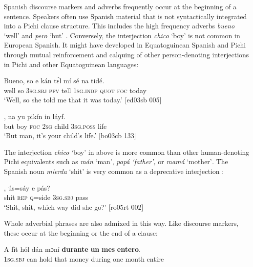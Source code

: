 Spanish discourse markers and adverbs frequently occur at the beginning of a sentence. Speakers often use Spanish material that is not syntactically integrated into a Pichi clause structure. This includes the high frequency adverbs \textit{bueno} ‘well’  and \textit{pero} ‘but’ . Conversely, the interjection \textit{chico} ‘boy’  is not common in European Spanish. It might have developed in Equatoguinean Spanish and Pichi through mutual reinforcement and calquing of other person-denoting interjections in Pichi and other Equatoguinean languages:


\ea%
    \label{ex:key:1735}
    \gll Bueno,  so  e    kán  tɛ́l  mí    sé    na  tidé.\\
well    so  \textsc{3sg.sbj}  \textsc{pfv}  tell  \textsc{1sg.indp}  \textsc{quot}    \textsc{foc}  today\\

\glt ‘Well, so she told me that it was today.’ [ed03sb 005]
\z


\ea%
    \label{ex:key:1736}
    \gll {}  ,  na  yu  pikín  in    láyf.\\
but    boy    \textsc{foc}  \textsc{2sg}  child  \textsc{3sg.poss}  life\\
\glt ‘But man, it’s your child’s life.’ [bo03cb 133]
\z

The interjection \textit{chico} ‘boy’ in  above is more common than other human-denoting Pichi equivalents such as \textit{mán} ‘man’,\textit{ papá} \textit{\textup{‘father’,} }or \textit{mamá} ‘mother’\textit{.} The Spanish noun \textit{mierda} ‘shit’\textit{} is very common as a deprecative interjection :


\ea%
    \label{ex:key:1737}
    \gll {}  ,  ús=sáy  e    pás?\\
shit    \textsc{rep}    \textsc{q}=side  \textsc{3sg.sbj}  pass  \\

\glt ‘Shit, shit, which way did she go?’ [ro05rt 002]
\z

Whole adverbial phrases are also admixed in this way. Like discourse markers, these occur at the beginning or the end of a clause: 


\ea%
    \label{ex:key:1738}
    \gll A    fít  hól  dán  mɔní  \textbf{durante}  \textbf{un}  \textbf{mes}    \textbf{entero}.\\
\textsc{1sg.sbj}  can  hold  that  money  during  one  month  entire\\

